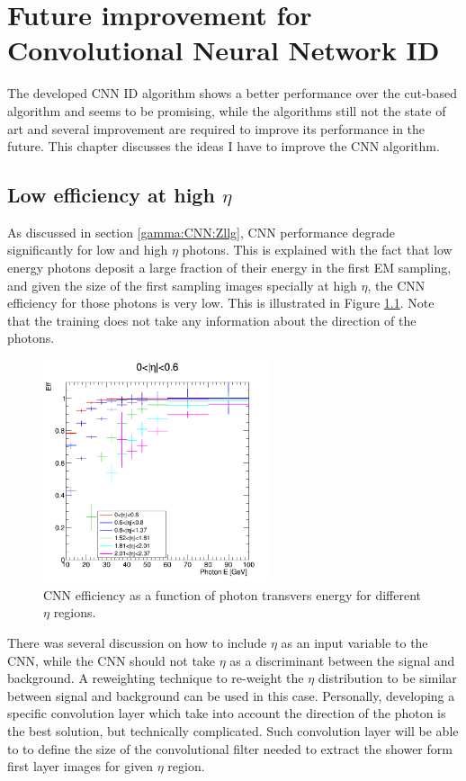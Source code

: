 \newpage
\chapter{Future improvement for Convolutional Neural Network ID}
\label{Adx3}
The developed CNN ID algorithm shows a better performance over the cut-based algorithm and seems to be promising, while the algorithms still not the state of art and several improvement are required to improve its performance in the future. This chapter discusses the ideas I have to improve the CNN algorithm.

\section{Low efficiency at high $\eta$}
\label{Adx3:Eta}

As discussed in section \ref{gamma:CNN:Zllg}, CNN performance degrade significantly for low \pT and high $\eta$ photons. This is explained with the fact that low energy photons deposit a large fraction of their energy in the first EM sampling, and given the size of the first sampling images specially at high $\eta$, the CNN efficiency for those photons is very low. This is illustrated in Figure \ref{fig:Adx3:Eta}. Note that the training does not take any information about the direction of the photons.
\begin{figure}[ht]
    \centering
    \includegraphics[width=0.6\textwidth]{Adx/Adx3/Img/Eff_vs_Energy.png}
    \caption{CNN efficiency as a function of photon transvers energy for different $\eta$ regions. }
    \label{fig:Adx3:Eta}
\end{figure}

There was several discussion on how to include $\eta$ as an input variable to the CNN, while the CNN should not take $\eta$ as a discriminant between the signal and background. A reweighting technique to re-weight the $\eta$ distribution to be similar between signal and background can be used in this case. Personally, developing a specific convolution layer which take into account the direction of the photon is the best solution, but technically complicated. Such convolution layer will be able to to define the size of the convolutional filter needed to extract the shower form first layer images for given $\eta$ region. \\

